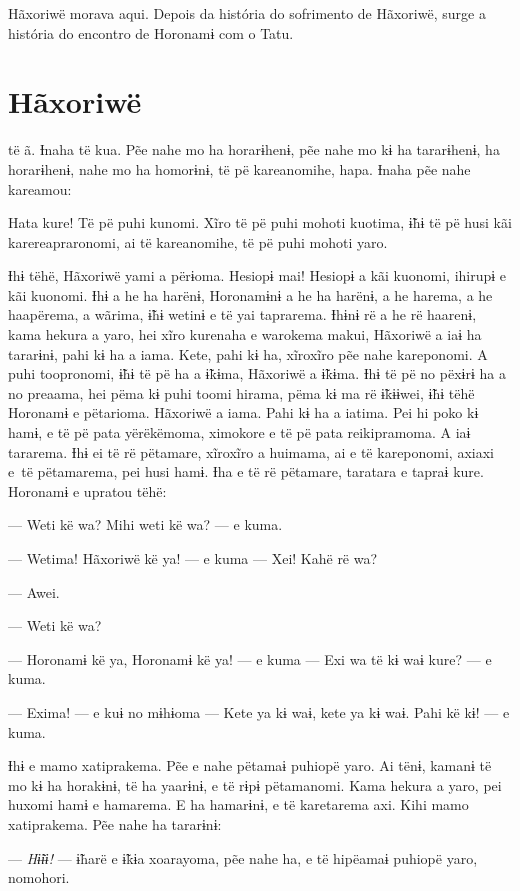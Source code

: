 Hãxoriwë morava aqui. Depois da história do sofrimento de Hãxoriwë,
surge a história do encontro de Horonamɨ com o Tatu.

\chapter{Hãxoriwë}

 të ã. Ɨnaha të kua. Pẽe nahe mo ha horarɨhenɨ, pẽe nahe mo kɨ
ha tararɨhenɨ, ha horarɨhenɨ, nahe mo ha homorɨnɨ, të pë kareanomihe,
hapa. Ɨnaha pẽe nahe kareamou: 

Hata kure! Të pë puhi kunomi. Xĩro të pë puhi mohoti kuotima, ɨ̃hɨ të pë
husi kãi karereapraronomi, ai të kareanomihe, të pë puhi mohoti yaro. 

Ɨhɨ tëhë, Hãxoriwë yami a përɨoma. Hesiopɨ mai! Hesiopɨ a kãi kuonomi,
ihirupɨ e kãi kuonomi. Ɨhɨ a he ha harënɨ, Horonamɨnɨ a he ha harënɨ, a
he harema, a he haapërema, a wãrima, ɨ̃hɨ wetinɨ e të yai taprarema.
Ɨhɨnɨ rë a he rë haarenɨ, kama hekura a yaro, hei xĩro kurenaha e
warokema makui, Hãxoriwë a iaɨ ha tararɨnɨ, pahi kɨ ha a iama. Kete,
pahi kɨ ha, xĩroxĩro pẽe nahe kareponomi. A puhi toopronomi, ɨ̃hɨ të pë
ha a ɨ̃kɨma, Hãxoriwë a ɨ̃kɨma. Ɨhɨ të pë no pëxɨrɨ ha a no preaama, hei
pëma kɨ puhi toomi hirama, pëma kɨ ma rë ɨ̃kɨɨwei, ɨ̃hɨ tëhë Horonamɨ e
pëtarioma. Hãxoriwë a iama. Pahi kɨ ha a iatima. Pei hi poko kɨ hamɨ, e
të pë pata yërëkëmoma, ximokore e të pë pata reikipramoma. A iaɨ
tararema. Ɨhɨ ei të rë pëtamare, xĩroxĩro a huimama, ai e të kareponomi,
axiaxi e~të pëtamarema, pei husi hamɨ. Ɨha e të rë pëtamare, taratara e
tapraɨ kure. Horonamɨ e upratou tëhë: 

--- Weti kë wa? Mihi weti kë wa? --- e kuma. 

--- Wetima! Hãxoriwë kë ya! --- e kuma --- Xei! Kahë rë wa? 

--- Awei. 

--- Weti kë wa?

--- Horonamɨ kë ya, Horonamɨ kë ya! --- e kuma --- Exi wa të kɨ waɨ kure?
--- e kuma.

--- Exima! --- e kuɨ no mɨhɨoma --- Kete ya kɨ waɨ, kete ya kɨ waɨ. Pahi kë
kɨ! --- e kuma.

Ɨhɨ e mamo xatiprakema. Pẽe e nahe pëtamaɨ puhiopë yaro. Ai tënɨ, kamanɨ
të mo kɨ ha horakɨnɨ, të ha yaarɨnɨ, e të rɨpɨ pëtamanomi. Kama hekura a
yaro, pei huxomi hamɨ e hamarema. E ha hamarɨnɨ, e të karetarema axi.
Kihi mamo xatiprakema. Pẽe nahe ha tararɨnɨ: 

--- \textit{Hɨ̃ɨɨ! }--- ɨ̃harë e ɨ̃kɨa xoarayoma, pẽe nahe ha, e të hipëamaɨ puhiopë
yaro, nomohori. 

